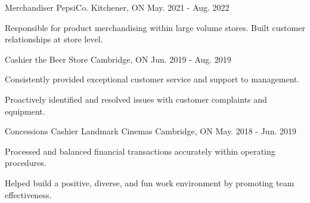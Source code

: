


\begin{cventries}


\cventry
{Merchandiser} %
{PepsiCo.} %
{Kitchener, ON} %
{May. 2021 - Aug. 2022} %
{ %
\begin{cvitems}
\item {Responsible for product merchandising within large volume stores. Built customer relationships at store level.}
\end{cvitems}
}


\cventry
{Cashier} %
{the Beer Store} %
{Cambridge, ON} %
{Jun. 2019 - Aug. 2019} %
{ %
\begin{cvitems}
\item {Consistently provided exceptional customer service and support to management.}
\item {Proactively identified and resolved issues with customer complaints and equipment.}
\end{cvitems}
}


\cventry
{Concessions Cashier} %
{Landmark Cinemas} %
{Cambridge, ON} %
{May. 2018 - Jun. 2019} %
{ %
\begin{cvitems}
\item {Processed and balanced financial transactions accurately within operating procedures.}
\item {Helped build a positive, diverse, and fun work environment by promoting team effectiveness.}
\end{cvitems} 
}



\end{cventries}
